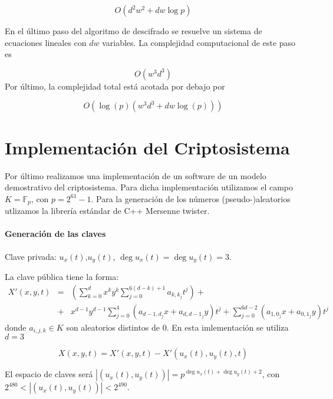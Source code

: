 \documentclass[12pt]{article}
\begin{document}
$$O(d^2 w^2 + dw \log p)$$ 

En el \'ultimo paso del algoritmo de descifrado se resuelve  un sistema de ecuaciones lineales con $dw$ variables. La complejidad computacional de este paso es 

$$O(w^3 d^3)$$ 
Por \'ultimo, la complejidad total est\'a acotada por debajo por

$$O(\log (p)(w^3 d^3 + dw \log(p)))$$ 



\section*{Implementaci\'on del Criptosistema}
\noindent

Por \'ultimo realizamos una implementaci\'on de un software de un modelo demostrativo del criptosistema. Para dicha implementaci\'on utilizamos el campo 
$K=\mathbb{F}_p$, con $p=2^{61}-1$. Para la generaci\'on de los n\'umeros (pseudo-)aleatorios utlizamos la librer\'ia est\'andar de C++ Mersenne twister. 


\paragraph*{Generaci\'on de las claves}
\noindent

Clave privada: $u_x(t)$,$u_y(t)$,  $\deg u_x(t) =\deg u_y(t)= 3$.

 La clave p\'ublica tiene la forma:
\begin{eqnarray*}
X'(x,y,t)&=&\left(\sum_{k=0}^{d} x^k y^k \sum_{j=0}^{6(d-k)+1} a_{k,k_j} t^j\right)+\\&+&x^{d-1} y^{d-1} \sum_{j=0}^{4}(a_{d-1,d_j}x + a_{d,d-1_j}y)t^j + \sum_{j=0}^{6d-2}(a_{1,0_j}x+a_{0,1_j}y)t^j
\end{eqnarray*}
donde $a_{i,j,k}\in K$ son aleatorios distintos de  0. En esta imlementaci\'on se utiliza $d=3$


$$X(x,y,t)=X'(x,y,t)- X'(u_x(t),u_y(t),t)$$

El espacio de claves ser\'a $|(u_x(t),u_y(t))|=p^{\deg u_x(t) +\deg u_y(t) +2}$, con \\$2^{480}<|(u_x(t),u_y(t))|<2^{490}$. 
\end{document}
